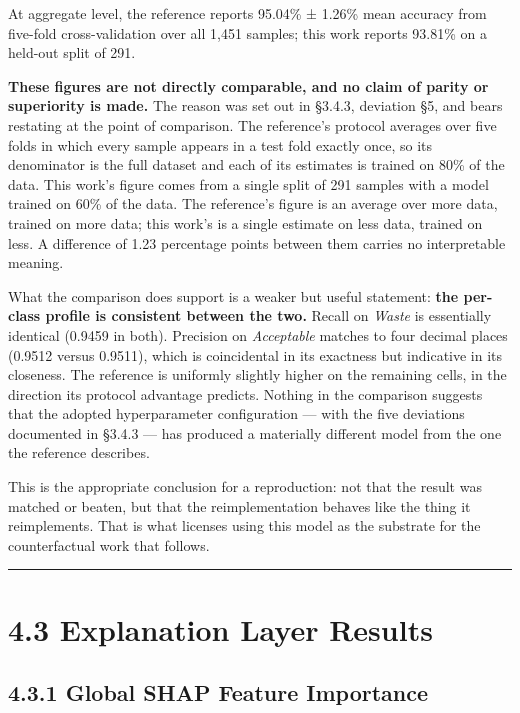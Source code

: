 At aggregate level, the reference reports 95.04\% ± 1.26\% mean accuracy from five-fold cross-validation over all 1,451 samples; this work reports 93.81\% on a held-out split of 291.

\textbf{These figures are not directly comparable, and no claim of parity or superiority is made.} The reason was set out in §3.4.3, deviation §5, and bears restating at the point of comparison. The reference's protocol averages over five folds in which every sample appears in a test fold exactly once, so its denominator is the full dataset and each of its estimates is trained on 80\% of the data. This work's figure comes from a single split of 291 samples with a model trained on 60\% of the data. The reference's figure is an average over more data, trained on more data; this work's is a single estimate on less data, trained on less. A difference of 1.23 percentage points between them carries no interpretable meaning.

What the comparison does support is a weaker but useful statement: \textbf{the per-class profile is consistent between the two.} Recall on \emph{Waste} is essentially identical (0.9459 in both). Precision on \emph{Acceptable} matches to four decimal places (0.9512 versus 0.9511), which is coincidental in its exactness but indicative in its closeness. The reference is uniformly slightly higher on the remaining cells, in the direction its protocol advantage predicts. Nothing in the comparison suggests that the adopted hyperparameter configuration --- with the five deviations documented in §3.4.3 --- has produced a materially different model from the one the reference describes.

This is the appropriate conclusion for a reproduction: not that the result was matched or beaten, but that the reimplementation behaves like the thing it reimplements. That is what licenses using this model as the substrate for the counterfactual work that follows.

\begin{center}\rule{0.5\linewidth}{0.5pt}\end{center}

\hypertarget{explanation-layer-results}{%
\section{4.3 Explanation Layer Results}\label{explanation-layer-results}}

\hypertarget{global-shap-feature-importance}{%
\subsection{4.3.1 Global SHAP Feature Importance}\label{global-shap-feature-importance}}

